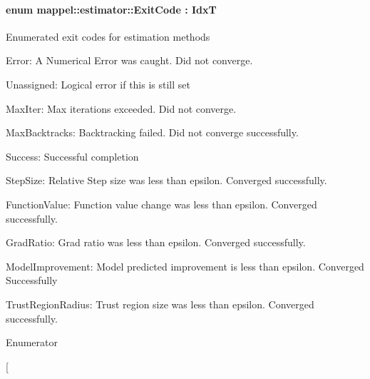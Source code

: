 \paragraph[{\texorpdfstring{Exit\+Code}{ExitCode}}]{\setlength{\rightskip}{0pt plus 5cm}enum {\bf mappel\+::estimator\+::\+Exit\+Code} \+: {\bf IdxT}\hspace{0.3cm}{\ttfamily [strong]}}\hypertarget{namespacemappel_1_1estimator_ae49999202b8a1968bc308aa30ac24e6c}{}\label{namespacemappel_1_1estimator_ae49999202b8a1968bc308aa30ac24e6c}
Enumerated exit codes for estimation methods
\begin{DoxyItemize}
\item Error\+: A Numerical Error was caught. Did not converge.
\item Unassigned\+: Logical error if this is still set
\item Max\+Iter\+: Max iterations exceeded. Did not converge.
\item Max\+Backtracks\+: Backtracking failed. Did not converge successfully.
\item Success\+: Successful completion
\item Step\+Size\+: Relative Step size was less than epsilon. Converged successfully.
\item Function\+Value\+: Function value change was less than epsilon. Converged successfully.
\item Grad\+Ratio\+: Grad ratio was less than epsilon. Converged successfully.
\item Model\+Improvement\+: Model predicted improvement is less than epsilon. Converged Successfully
\item Trust\+Region\+Radius\+: Trust region size was less than epsilon. Converged successfully. 
\end{DoxyItemize}\begin{Desc}
\item[Enumerator]\par
\begin{description}
\item[{\em 
Trust\+Region\+Radius\hypertarget{namespacemappel_1_1estimator_ae49999202b8a1968bc308aa30ac24e6caadd208e6fbd6ef5ab84a287f259c3b81}{}\label{namespacemappel_1_1estimator_ae49999202b8a1968bc308aa30ac24e6caadd208e6fbd6ef5ab84a287f259c3b81}
}]\item[{\em 
}
\end{description}
\end{Desc}
